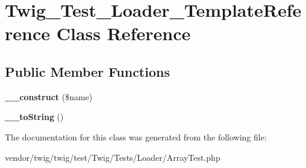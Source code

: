 \hypertarget{classTwig__Test__Loader__TemplateReference}{}\section{Twig\+\_\+\+Test\+\_\+\+Loader\+\_\+\+Template\+Reference Class Reference}
\label{classTwig__Test__Loader__TemplateReference}
\subsection*{Public Member Functions}
\begin{DoxyCompactItemize}
\item 
{\bfseries \+\_\+\+\_\+construct} (\$name)\hypertarget{classTwig__Test__Loader__TemplateReference_a08066df31d5da068de5fa15a61fb2584}{}\label{classTwig__Test__Loader__TemplateReference_a08066df31d5da068de5fa15a61fb2584}

\item 
{\bfseries \+\_\+\+\_\+to\+String} ()\hypertarget{classTwig__Test__Loader__TemplateReference_a07809fd72460b81240bccbf9dd50aeaf}{}\label{classTwig__Test__Loader__TemplateReference_a07809fd72460b81240bccbf9dd50aeaf}

\end{DoxyCompactItemize}


The documentation for this class was generated from the following file\+:\begin{DoxyCompactItemize}
\item 
vendor/twig/twig/test/\+Twig/\+Tests/\+Loader/Array\+Test.\+php\end{DoxyCompactItemize}
